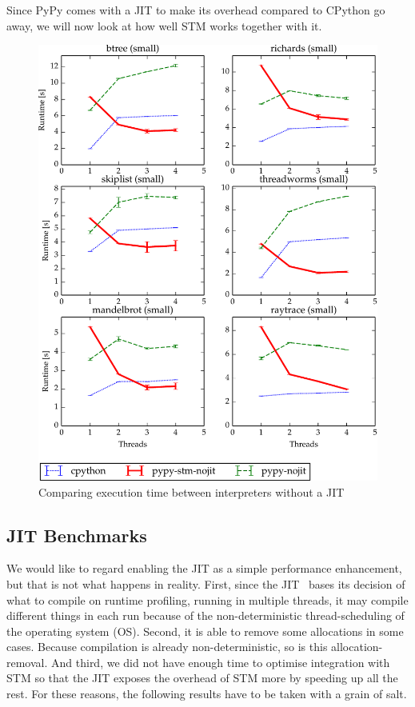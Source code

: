 \documentclass{sigplanconf}
\begin{document}
Since PyPy comes with a JIT to make its overhead compared to CPython
go away, we will now look at how well STM works together with it.

\begin{figure}[h]
  \centering
  \includegraphics[width=1\columnwidth]{plots/performance_nojit.pdf}
  \caption{Comparing execution time between interpreters without a JIT\label{fig:performance-nojit}}
\end{figure}



\subsection{JIT Benchmarks\label{subsec:jit-benchs}}

We would like to regard enabling the JIT as a simple performance
enhancement, but that is not what happens in reality. First, since the
JIT~\cite{cfbolz09} bases its decision of what to compile on runtime
profiling, running in multiple threads, it may compile different
things in each run because of the non-deterministic thread-scheduling
of the operating system (OS). Second, it is able to remove some
allocations in some cases. Because compilation is already
non-deterministic, so is this allocation-removal. And third, we did
not have enough time to optimise integration with STM so that the JIT
exposes the overhead of STM more by speeding up all the rest.
For these reasons, the following results have to be taken with a grain
of salt.
\end{document}

